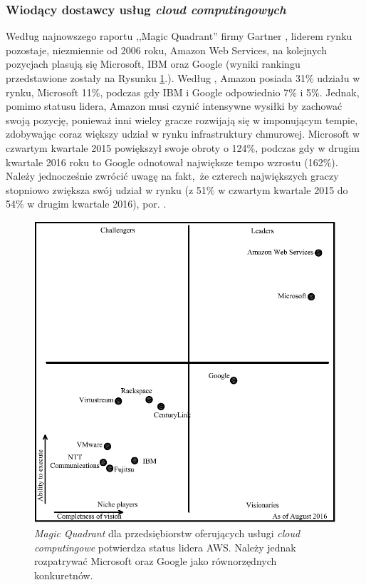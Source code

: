 \documentclass[12pt,a4paper,twoside]{article}
\begin{document}
\subsubsection{Wiodący dostawcy usług \textit{cloud computingowych}}

\noindent
Według najnowszego raportu ,,Magic Quadrant'' firmy Gartner \citep{leong2017}, liderem rynku pozostaje, niezmiennie od 2006 roku, Amazon Web Services, na kolejnych pozycjach plasują się Microsoft, IBM oraz Google (wyniki rankingu przedstawione zostały na Rysunku \ref{fig:mquad}.). Według \citet{forbes2017}, Amazon posiada 31\% udziału w rynku, Microsoft 11\%, podczas gdy IBM i Google odpowiednio 7\% i 5\%. Jednak, pomimo statusu lidera, Amazon musi czynić intensywne wysiłki by zachować swoją pozycję, ponieważ inni wielcy gracze rozwijają się w imponującym tempie, zdobywając coraz większy udział w rynku infrastruktury chmurowej. Microsoft w czwartym kwartale 2015 powiększył swoje obroty o 124\%, podczas gdy w drugim kwartale 2016 roku to Google odnotował największe tempo wzrostu (162\%). Należy jednocześnie zwrócić uwagę na fakt, że czterech największych graczy stopniowo zwiększa swój udział w rynku (z 51\% w czwartym kwartale 2015 do 54\% w drugim kwartale 2016), por. \citet{forbes2017}.

\begin{figure}[h]
  \centering
\includegraphics[scale=0.8]{../obrazy/fig:mquad.png}
\caption{\textit{Magic Quadrant} dla przedsiębiorstw oferujących usługi \textit{cloud computingowe} potwierdza status lidera AWS. Należy jednak rozpatrywać Microsoft oraz Google jako równorzędnych konkuretnów.\label{fig:mquad}}
\end{figure}
\end{document}
